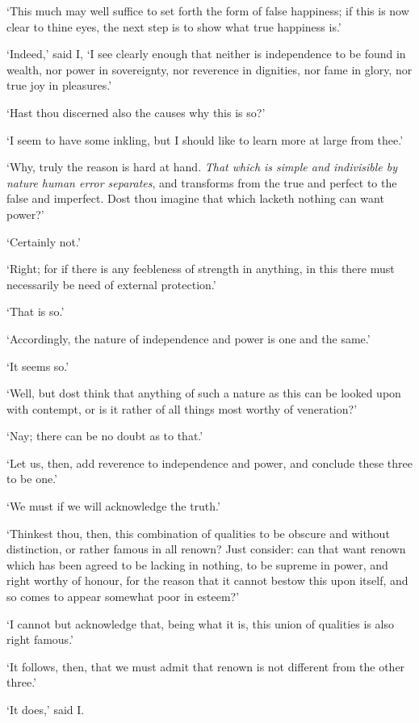 \documentclass[12pt]{book}
\begin{document}
`This much may well suffice to set forth the form of false happiness; if
this is now clear to thine eyes, the next step is to show what true
happiness is.'

`Indeed,' said I, `I see clearly enough that neither is independence to
be found in wealth, nor power in sovereignty, nor reverence in
dignities, nor fame in glory, nor true joy in pleasures.'

`Hast thou discerned also the causes why this is so?'

`I seem to have some inkling, but I should like to learn more at large
from thee.'

`Why, truly the reason is hard at hand. \emph{That which is simple and indivisible by nature human error separates}, and transforms from the
true and perfect to the false and imperfect. Dost thou imagine that
which lacketh nothing can want power?'

`Certainly not.'

`Right; for if there is any feebleness of strength in anything, in this
there must necessarily be need of external protection.'

`That is so.'

`Accordingly, the nature of independence and power is one and the same.'

`It seems so.'

`Well, but dost think that anything of such a nature as this can be
looked upon with contempt, or is it rather of all things most worthy of
veneration?'

`Nay; there can be no doubt as to that.'

`Let us, then, add reverence to independence and power, and conclude
these three to be one.'

`We must if we will acknowledge the truth.'

`Thinkest thou, then, this combination of qualities to be obscure and
without distinction, or rather famous in all renown? Just consider: can
that want renown which has been agreed to be lacking in nothing, to be
supreme in power, and right worthy of honour, for the reason that it
cannot bestow this upon itself, and so comes to appear somewhat poor in
esteem?'

`I cannot but acknowledge that, being what it is, this union of
qualities is also right famous.'

`It follows, then, that we must admit that renown is not different from
the other three.'

`It does,' said I.
\end{document}
